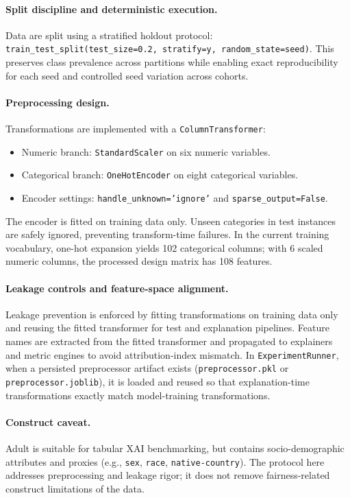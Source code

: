 \documentclass[twoside,11pt]{article}
\begin{document}
\paragraph{Split discipline and deterministic execution.}
Data are split using a stratified holdout protocol:
\texttt{train\_test\_split(test\_size=0.2, stratify=y, random\_state=seed)}.
This preserves class prevalence across partitions while enabling exact
reproducibility for each seed and controlled seed variation across cohorts.

\paragraph{Preprocessing design.}
Transformations are implemented with a \texttt{ColumnTransformer}:
\begin{itemize}[leftmargin=*]
    \item Numeric branch: \texttt{StandardScaler} on six numeric variables.
    \item Categorical branch: \texttt{OneHotEncoder} on eight categorical variables.
    \item Encoder settings: \texttt{handle\_unknown='ignore'} and \texttt{sparse\_output=False}.
\end{itemize}
The encoder is fitted on training data only. Unseen categories in test
instances are safely ignored, preventing transform-time failures. In the
current training vocabulary, one-hot expansion yields 102 categorical columns;
with 6 scaled numeric columns, the processed design matrix has 108 features.

\paragraph{Leakage controls and feature-space alignment.}
Leakage prevention is enforced by fitting transformations on training data only
and reusing the fitted transformer for test and explanation pipelines.
Feature names are extracted from the fitted transformer and propagated to
explainers and metric engines to avoid attribution-index mismatch. In
\texttt{ExperimentRunner}, when a persisted preprocessor artifact exists
(\texttt{preprocessor.pkl} or \texttt{preprocessor.joblib}), it is loaded and
reused so that explanation-time transformations exactly match model-training
transformations.

\paragraph{Construct caveat.}
Adult is suitable for tabular XAI benchmarking, but contains socio-demographic
attributes and proxies (e.g., \texttt{sex}, \texttt{race},
\texttt{native-country}). The protocol here addresses preprocessing and leakage
rigor; it does not remove fairness-related construct limitations of the data.
\end{document}
